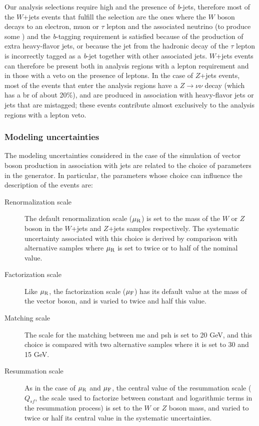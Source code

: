 Our analysis selections require high \met and the presence of \textit{b}-jets, therefore most of the $W$+jets events that fulfill the selection are the ones where the $W$ boson decays to an electron, muon or $\tau$ lepton 
and the associated neutrino (to produce some \met) and the \textit{b}-tagging requirement is satisfied because of the production of extra heavy-flavor jets, or because the jet from the hadronic decay of the $\tau$
lepton is incorrectly tagged as a \textit{b}-jet together with other associated jets. 
$W$+jets events can therefore be present both in analysis regions with a lepton requirement and in those with a veto on the presence of leptons. 
In the case of $Z$+jets events, most of the events that enter the analysis regions have a $Z \to \nu \nu$ decay (which has a \gls{br} of about 20\%), and are produced in association with 
heavy-flavor jets or jets that are mistagged; these events contribute almost exclusively to the analysis regions with a lepton veto. 

\subsubsection*{Modeling uncertainties}

The modeling uncertainties considered in the case of the simulation of vector boson production in association with jets are related to the choice of parameters in the \Sherpa generator. 
In particular, the parameters whose choice can influence the description of the events are:

\begin{description}
\item[Renormalization scale] The default renormalization scale ($\mu_{\rm{R}}$) is set to the mass of the $W$ or $Z$ boson in the $W$+jets and $Z$+jets samples respectively. 
The systematic uncertainty associated with this choice is derived by comparison with alternative samples where $\mu_{\rm{R}}$ is set to twice or to half of the nominal value. 

\item[Factorization scale] Like $\mu_{\rm{R}}$, the factorization scale ($\mu_{\rm{F}}$) has its default value at the mass of the vector boson, and is varied to twice and half this value.

\item[Matching scale] The scale for the matching between \gls{me} and \gls{psh} is set to 20 GeV, and this choice is compared with two alternative samples where it is set to 30 and 15 GeV.

\item[Resummation scale] As in the case of $\mu_{\rm{R}}$ and $\mu_{\rm{F}}$, the central value of the resummation scale ($Q_{sf}$, the scale used to factorize between constant and logarithmic terms
in the resummation process) is set to the $W$ or $Z$ boson mass, and varied to twice or half its central value in the systematic uncertainties. 

\end{description}

